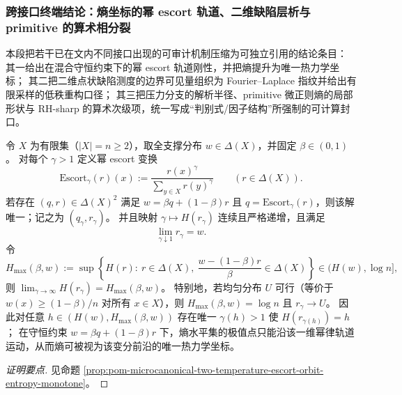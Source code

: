 
\subsubsection{跨接口终端结论：熵坐标的幂 escort 轨道、二维缺陷层析与 primitive 的算术相分裂}\label{subsubsec:xi-escort-defect-primitive-arithmetic-splitting}
本段把若干已在文内不同接口出现的可审计机制压缩为可独立引用的结论条目：
其一给出在混合守恒约束下的幂 escort 轨道刚性，并把熵提升为唯一热力学坐标；
其二把二维点状缺陷测度的边界可见量组织为 Fourier--Laplace 指纹并给出有限采样的低秩重构口径；
其三把压力分支的解析半径、primitive 微正则熵的局部形状与 RH-sharp 的算术次级项，统一写成“判别式/因子结构”所强制的可计算封口。

\begin{conclusion}\label{con:xi-terminal-escort-entropy-thermo-coordinate}
令 \(X\) 为有限集（\(|X|=n\ge 2\)），取全支撑分布 \(w\in\Delta(X)\)，并固定 \(\beta\in(0,1)\)。
对每个 \(\gamma>1\) 定义幂 escort 变换
\[
\mathrm{Escort}_\gamma(r)(x):=\frac{r(x)^\gamma}{\sum_{y\in X}r(y)^\gamma}\qquad(r\in\Delta(X)).
\]
若存在 \((q,r)\in\Delta(X)^2\) 满足 \(w=\beta q+(1-\beta)r\) 且 \(q=\mathrm{Escort}_\gamma(r)\)，则该解唯一；记之为 \((q_\gamma,r_\gamma)\)。
并且映射 \(\gamma\mapsto H(r_\gamma)\) 连续且严格递增，且满足
\[
\lim_{\gamma\downarrow 1}r_\gamma=w.
\]
令
\[
H_{\max}(\beta,w):=\sup\left\{H(r):\ r\in\Delta(X),\ \frac{w-(1-\beta)r}{\beta}\in\Delta(X)\right\}\in(H(w),\log n],
\]
则 \(\lim_{\gamma\to\infty}H(r_\gamma)=H_{\max}(\beta,w)\)。
特别地，若均匀分布 \(U\) 可行（等价于 \(w(x)\ge (1-\beta)/n\) 对所有 \(x\in X\)），则 \(H_{\max}(\beta,w)=\log n\) 且 \(r_\gamma\to U\)。
因此对任意 \(h\in(H(w),H_{\max}(\beta,w))\) 存在唯一 \(\gamma(h)>1\) 使 \(H(r_{\gamma(h)})=h\)；
在守恒约束 \(w=\beta q+(1-\beta)r\) 下，熵水平集的极值点只能沿该一维幂律轨道运动，从而熵可被视为该变分前沿的唯一热力学坐标。
\end{conclusion}
\begin{proof}[证明要点]
见命题 \ref{prop:pom-microcanonical-two-temperature-escort-orbit-entropy-monotone}。
\end{proof}

